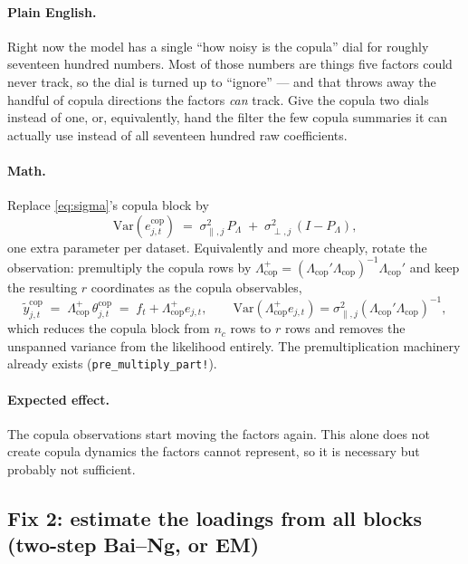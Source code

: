 \documentclass[11pt]{article}
\newcommand{\cop}{\mathrm{cop}}
\newcommand{\Var}{\mathrm{Var}}
\newcommand{\code}[1]{\texttt{#1}}
\begin{document}
\paragraph{Plain English.} Right now the model has a single ``how noisy is the
copula'' dial for roughly seventeen hundred numbers. Most of those numbers are
things five factors could never track, so the dial is turned up to ``ignore'' ---
and that throws away the handful of copula directions the factors \emph{can}
track. Give the copula two dials instead of one, or, equivalently, hand the
filter the few copula summaries it can actually use instead of all seventeen
hundred raw coefficients.

\paragraph{Math.} Replace \eqref{eq:sigma}'s copula block by
\begin{equation}
  \Var(e^{\cop}_{j,t}) \;=\; \sigma_{\parallel,j}^2\, P_\Lambda \;+\; \sigma_{\perp,j}^2\, (I - P_\Lambda),
  \label{eq:twosigma}
\end{equation}
one extra parameter per dataset. Equivalently and more cheaply, rotate the
observation: premultiply the copula rows by $\Lambda_{\cop}^{+} =
(\Lambda_{\cop}'\Lambda_{\cop})^{-1}\Lambda_{\cop}'$ and keep the resulting $r$
coordinates as the copula observables,
\begin{equation}
  \tilde y^{\cop}_{j,t} \;=\; \Lambda^{+}_{\cop}\, \theta^{\cop}_{j,t}
  \;=\; f_t + \Lambda^{+}_{\cop} e_{j,t},
  \qquad
  \Var(\Lambda^{+}_{\cop} e_{j,t}) = \sigma^2_{\parallel,j} (\Lambda_{\cop}'\Lambda_{\cop})^{-1},
\end{equation}
which reduces the copula block from $n_c$ rows to $r$ rows and removes the
unspanned variance from the likelihood entirely. The premultiplication machinery
already exists (\code{pre\_multiply\_part!}).

\paragraph{Expected effect.} The copula observations start moving the factors
again. This alone does not create copula dynamics the factors cannot represent,
so it is necessary but probably not sufficient.

\subsection{Fix 2: estimate the loadings from all blocks (two-step Bai--Ng, or EM)}
\end{document}
